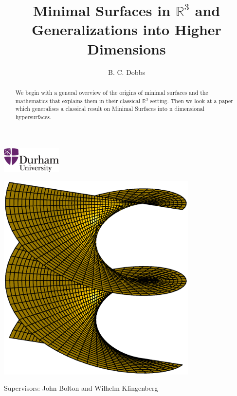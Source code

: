 \documentclass[a4paper,12pt]{article}
\author{B. C. Dobbs}
\title{Minimal Surfaces in $\mathbb R^3$ and Generalizations into Higher Dimensions}
\begin{document}
\begin{titlepage}
\begin{flushright}
\includegraphics[width=3cm]{Images/DU.eps}
\end{flushright}
\linebreak
{}
\linebreak
\begin{abstract}
\nohyphens{We begin with a general overview of the origins of minimal surfaces and the mathematics that explains them in their classical $\mathbb R^3$ setting. Then we look at a paper which generalises a classical result on Minimal Surfaces into n dimensional hypersurfaces.}
\end{abstract}

\begin{center}\includegraphics[width=10cm]{Images/Helicoid.eps}\end{center}


\begin{center}
Supervisors: John Bolton and Wilhelm Klingenberg
\end{center}
\end{titlepage}

\newpage
\tableofcontents
\newpage

\newpage

\newpage

\newpage

\newpage

\newpage

\newpage

\newpage

\newpage

\newpage

\end{document}
